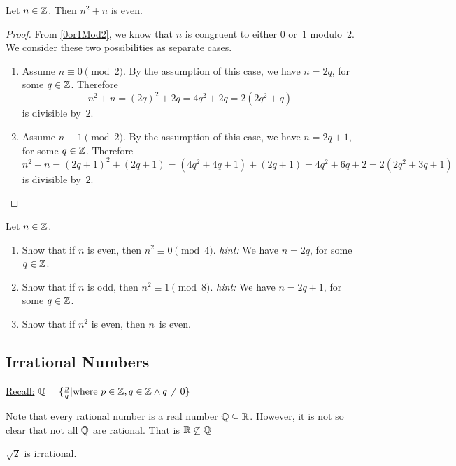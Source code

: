 \documentclass[../MATH-2000-Notes.tex]{subfiles}
\begin{document}
\begin{Proposition}
    {}\label{n2+nEven}
    Let $n \in \mathbb{Z}$. Then $n^2 + n$ is even.
\end{Proposition}
\begin{proof}
    From \ref{0or1Mod2}, we know that $n$ is congruent to either $0$ or~$1$ modulo~$2$. We consider these two possibilities as separate cases.

    \begin{enumerate}
        \item
              Assume $n \equiv 0 \pmod 2$.
              By the assumption of this case, we have $n = 2q$, for some $q \in \mathbb{Z}$. Therefore
              $$ n^2 + n = (2q)^2 + 2q = 4q^2 + 2q = 2(2q^2 + q)$$
              is divisible by~$2$.
        \item
              Assume $n \equiv 1 \pmod 2$.
              By the assumption of this case, we have $n = 2q+1$, for some $q \in \mathbb{Z} $. Therefore
              $$ n^2 + n
                  = (2q+1)^2 + (2q+1)
                  = (4q^2 + 4q + 1) + (2q+ 1)
                  = 4q^2 + 6q+ 2
                  = 2(2q^2 + 3q + 1)$$
              is divisible by~$2$.
    \end{enumerate}
\end{proof}

Let $n \in \mathbb{Z}$.
\begin{enumerate}
\item \label{SquareMod4or8Ex-even}
Show that if $n$ is even, then $n^2 \equiv 0 \pmod{4}$.
{\textit{hint:} We have $n = 2q$, for some $q \in \mathbb{Z}$.}
\item \label{SquareMod4or8Ex-odd}
Show that if $n$ is odd, then $n^2 \equiv 1 \pmod{8}$.
{\textit{hint:} We have $n = 2q+1$, for some $q \in \mathbb{Z}$.}
\item \label{SquareMod4or8Ex-squareeven}
Show that if $n^2$ is even, then $n$~is even.
\end{enumerate}


\subsection{Irrational Numbers}
\underline{Recall:} \(\mathbb{Q} = \{\frac{p}{q}|\text{where}\ p\in\mathbb{Z}, q\in\mathbb{Z} \wedge q\neq 0\}\)

Note that every rational number is a real number \(\mathbb{Q} \subseteq \mathbb{R}\). However, it is not so clear that not all \(\mathbb{Q}\) are rational. That is \(\mathbb{R} \not\subseteq \mathbb{Q}\)

\begin{Proposition}
    {}
    \label{Sqrt2Irrat}
    $\sqrt{2}$ is irrational.
\end{Proposition}
\end{document}
